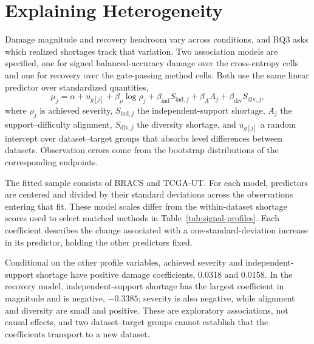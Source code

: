 \documentclass[11pt]{article}
\newcommand{\resultstable}[1]{}
\begin{document}
\section{Explaining Heterogeneity}
\label{sec:rq3}
Damage magnitude and recovery headroom vary across conditions, and RQ3 asks which realized shortages track that variation. Two association models are specified, one for signed balanced-accuracy damage over the cross-entropy cells and one for recovery over the gate-passing method cells. Both use the same linear predictor over standardized quantities,
\begin{equation}
  \mu_j = \alpha + u_{g[j]} + \beta_{\rho}\log \rho_j + \beta_{\mathrm{ind}} S_{\mathrm{ind},j} + \beta_{A} A_j + \beta_{\mathrm{div}} S_{\mathrm{div},j},
  \label{eq:rq3-model}
\end{equation}
\noindent where $\rho_j$ is achieved severity, $S_{\mathrm{ind},j}$ the independent-support shortage, $A_j$ the support--difficulty alignment, $S_{\mathrm{div},j}$ the diversity shortage, and $u_{g[j]}$ a random intercept over dataset--target groups that absorbs level differences between datasets. Observation errors come from the bootstrap distributions of the corresponding endpoints.

The fitted sample consists of BRACS and TCGA-UT. For each model, predictors are centered and divided by their standard deviations across the observations entering that fit. These model scales differ from the within-dataset shortage scores used to select matched methods in Table~\ref{tab:signal-profiles}. Each coefficient describes the change associated with a one-standard-deviation increase in its predictor, holding the other predictors fixed.

\begin{table}[ht]
  \centering
  \scriptsize
  \resultstable{rq3_models}
  \caption{Maximum a posteriori estimates for the two exploratory association models fitted to BRACS and TCGA-UT. Damage is signed balanced-accuracy loss and recovery is the recovered fraction. Predictors are standardized within each model's fitted sample.}
  \label{tab:rq3-models}
\end{table}

\noindent Conditional on the other profile variables, achieved severity and independent-support shortage have positive damage coefficients, \num{0.0318} and \num{0.0158}. In the recovery model, independent-support shortage has the largest coefficient in magnitude and is negative, $-\num{0.3385}$; severity is also negative, while alignment and diversity are small and positive. These are exploratory associations, not causal effects, and two dataset--target groups cannot establish that the coefficients transport to a new dataset.
\end{document}

